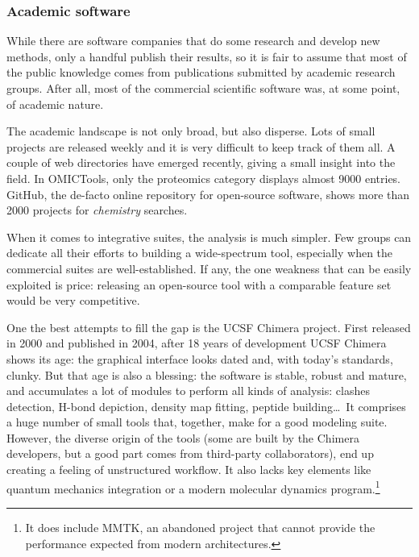 \subsubsection{Academic software}
While there are software companies that do some research and develop new methods, only a handful publish their results, so it is fair to assume that most of the public knowledge comes from publications submitted by academic research groups. After all, most of the commercial scientific software was, at some point, of academic nature.\cite{gaussian,schrodingerpymol}

The academic landscape is not only broad, but also disperse. Lots of small projects are released weekly and it is very difficult to keep track of them all. A couple of web directories have emerged recently,\cite{omictools,pirhadi2016open} giving a small insight into the field. In OMICTools,\cite{omictools} only the proteomics category displays almost 9000 entries. GitHub,\cite{github} the de-facto online repository for open-source software, shows more than 2000 projects for \textit{chemistry} searches.

When it comes to integrative suites, the analysis is much simpler. Few groups can dedicate all their efforts to building a wide-spectrum tool, especially when the commercial suites are well-established. If any, the one weakness that can be easily exploited is price: releasing an open-source tool with a comparable feature set would be very competitive.

One the best attempts to fill the gap is the UCSF Chimera project. First released in 2000\cite{firstchimera} and published in 2004,\cite{chimera} after 18 years of development UCSF Chimera shows its age: the graphical interface looks dated and, with today's standards, clunky. But that age is also a blessing: the software is stable, robust and mature, and accumulates a lot of modules to perform all kinds of analysis: clashes detection, H-bond depiction, density map fitting, peptide building\ldots\  It comprises a huge number of small tools that, together, make for a good modeling suite. However, the diverse origin of the tools (some are built by the Chimera developers, but a good part comes from third-party collaborators), end up creating a feeling of unstructured workflow. It also lacks key elements like quantum mechanics integration or a modern molecular dynamics program.\footnote{It does include MMTK,\cite{mmtk} an abandoned project that cannot provide the performance expected from modern architectures.}

